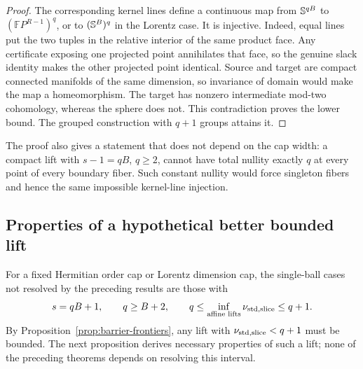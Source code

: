\begin{proof}
The corresponding kernel lines define a continuous map from
$\mathbb S^{qB}$ to $(\mathbb FP^{R-1})^q$, or to $(\mathbb S^B)^q$ in the
Lorentz case. It is injective. Indeed, equal lines put the two tuples in
the relative interior of the same product face. Any certificate exposing
one projected point annihilates that face, so the genuine slack identity
makes the other projected point identical. Source and target are compact
connected manifolds of the same dimension, so invariance of domain would
make the map a homeomorphism. The target has nonzero intermediate
mod-two cohomology, whereas the sphere does not. This contradiction
proves the lower bound. The grouped construction with $q+1$ groups
attains it.
\end{proof}

The proof also gives a statement that does not depend on the cap width:
a compact lift with $s-1=qB$, $q\geq2$, cannot have total nullity exactly
$q$ at every point of every boundary fiber. Such constant nullity would
force singleton fibers and hence the same impossible kernel-line
injection.

\subsection{Properties of a hypothetical better bounded lift}
For a fixed Hermitian order cap or Lorentz dimension cap, the single-ball
cases not resolved by the preceding results are those with
\begin{equation}\label{eq:unsettled-range}
 s=qB+1,\qquad q\geq B+2,
 \qquad q\leq\inf_{\text{affine lifts}}\nu_{\mathrm{std},\mathrm{slice}}\leq q+1.
\end{equation}
By Proposition~\ref{prop:barrier-frontiers}, any lift with $\nu_{\mathrm{std},\mathrm{slice}}<q+1$
must be bounded. The next proposition derives necessary properties of
such a lift; none of the preceding theorems depends on resolving this
interval.

